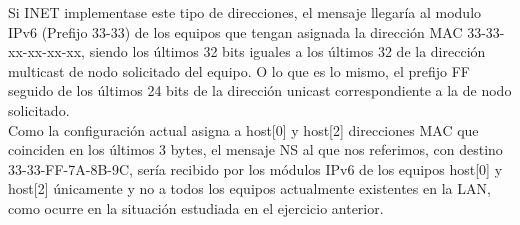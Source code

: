 Si INET implementase este tipo de direcciones, el mensaje llegaría al modulo IPv6 (Prefijo 33-33) de los equipos que tengan asignada la dirección MAC 33-33-xx-xx-xx-xx, siendo los últimos 32 bits iguales a los últimos 32 de la dirección multicast de nodo solicitado del equipo. O lo que es lo mismo, el prefijo FF seguido de los últimos 24 bits de la dirección unicast correspondiente a la de nodo solicitado. \\
Como la configuración actual asigna a host[0] y host[2] direcciones MAC que coinciden en los últimos 3 bytes, el mensaje NS al que nos referimos, con destino 33-33-FF-7A-8B-9C, sería recibido por los módulos IPv6 de los equipos host[0] y host[2] únicamente y no a todos los equipos actualmente existentes en la LAN, como ocurre en la situación estudiada en el ejercicio anterior.